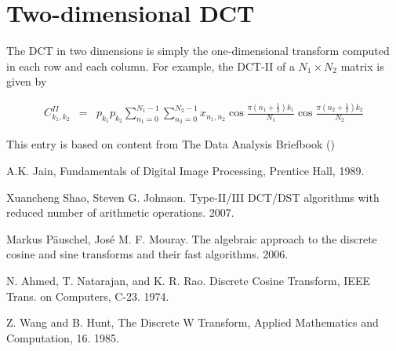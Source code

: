 \documentclass[12pt]{article}
\begin{document}
\section{Two-dimensional DCT}

The DCT in two dimensions is simply the one-dimensional transform computed in each row and each column. For example, the DCT-II of a $N_1\times N_2$ matrix is given by

\begin{eqnarray*}
C^{II}_{k_1,k_2}&=&p_{k_1}p_{k_2}\sum _{n_1=0}^{N_1-1}\sum _{n_2=0}^{N_2-1} x_{n_1,n_2} \cos \frac{\pi\left( n_1+\frac{1}{2}\right) k_1}{N_1}  \cos \frac{\pi\left( n_2+\frac{1}{2}\right) k_2}{N_2}
\end{eqnarray*}

\begin{thebibliography}{3}

 This entry is based on content from The Data Analysis Briefbook
()

 A.K. Jain, Fundamentals of Digital Image Processing, Prentice Hall, 1989.

 Xuancheng Shao, Steven G. Johnson. Type-II/III DCT/DST algorithms with reduced number of arithmetic operations. 2007.

 Markus P\"auschel, Jos\'e M. F. Mouray. The algebraic approach to the discrete cosine and
sine transforms and their fast algorithms. 2006.

 N. Ahmed, T. Natarajan, and K. R. Rao. Discrete Cosine Transform, IEEE Trans. on
Computers, C-23. 1974.

 Z. Wang and B. Hunt, The Discrete W Transform, Applied Mathematics and Computation,
16. 1985.

\end{thebibliography}
\end{document}
